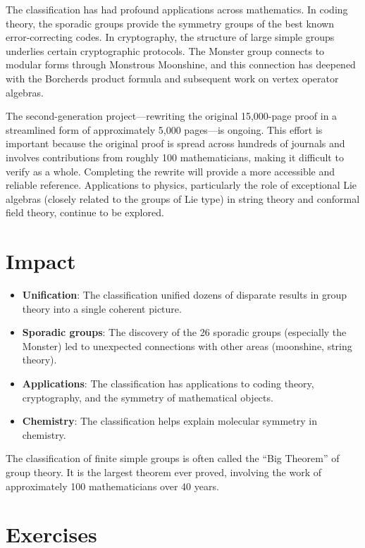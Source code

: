 The classification has had profound applications across mathematics. In coding theory, the sporadic groups provide the symmetry groups of the best known error-correcting codes. In cryptography, the structure of large simple groups underlies certain cryptographic protocols. The Monster group connects to modular forms through Monstrous Moonshine, and this connection has deepened with the Borcherds product formula and subsequent work on vertex operator algebras.

The second-generation project---rewriting the original 15,000-page proof in a streamlined form of approximately 5,000 pages---is ongoing. This effort is important because the original proof is spread across hundreds of journals and involves contributions from roughly 100 mathematicians, making it difficult to verify as a whole. Completing the rewrite will provide a more accessible and reliable reference. Applications to physics, particularly the role of exceptional Lie algebras (closely related to the groups of Lie type) in string theory and conformal field theory, continue to be explored.

\section{Impact}

\begin{itemize}
\item \textbf{Unification}: The classification unified dozens of disparate results in group theory into a single coherent picture.
\item \textbf{Sporadic groups}: The discovery of the 26 sporadic groups (especially the Monster) led to unexpected connections with other areas (moonshine, string theory).
\item \textbf{Applications}: The classification has applications to coding theory, cryptography, and the symmetry of mathematical objects.
\item \textbf{Chemistry}: The classification helps explain molecular symmetry in chemistry.
\end{itemize}

\begin{highlightbox}
The classification of finite simple groups is often called the ``Big Theorem'' of group theory. It is the largest theorem ever proved, involving the work of approximately 100 mathematicians over 40 years.
\end{highlightbox}

\section{Exercises}

